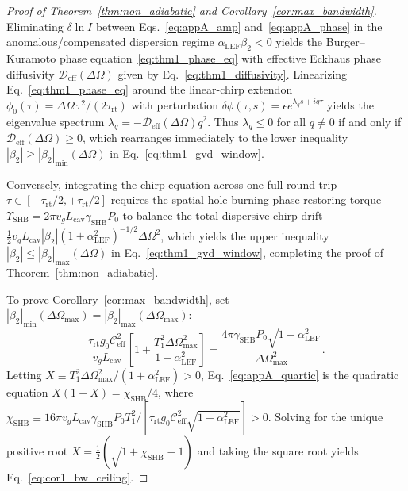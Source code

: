 \documentclass[11pt,letterpaper]{article}
\begin{document}
\begin{proof}[Proof of Theorem~\ref{thm:non_adiabatic} and Corollary~\ref{cor:max_bandwidth}]
\begin{subequations}
\end{subequations}
Eliminating $\delta\ln I$ between Eqs.~\eqref{eq:appA_amp} and~\eqref{eq:appA_phase} in the anomalous/compensated dispersion regime $\alpha_{\mathrm{LEF}}\beta_2 < 0$ yields the Burger--Kuramoto phase equation~\eqref{eq:thm1_phase_eq} with effective Eckhaus phase diffusivity $\mathcal{D}_{\mathrm{eff}}(\Delta\Omega)$ given by Eq.~\eqref{eq:thm1_diffusivity}. Linearizing Eq.~\eqref{eq:thm1_phase_eq} around the linear-chirp extendon $\phi_0(\tau) = \Delta\Omega\,\tau^2 / (2\tau_{\mathrm{rt}})$ with perturbation $\delta\phi(\tau, s) = \epsilon e^{\lambda_q s + i q \tau}$ yields the eigenvalue spectrum $\lambda_q = -\mathcal{D}_{\mathrm{eff}}(\Delta\Omega) q^2$. Thus $\lambda_q \le 0$ for all $q \neq 0$ if and only if $\mathcal{D}_{\mathrm{eff}}(\Delta\Omega) \ge 0$, which rearranges immediately to the lower inequality $|\beta_2| \ge |\beta_2|_{\min}(\Delta\Omega)$ in Eq.~\eqref{eq:thm1_gvd_window}.

Conversely, integrating the chirp equation across one full round trip $\tau \in [-\tau_{\mathrm{rt}}/2, +\tau_{\mathrm{rt}}/2]$ requires the spatial-hole-burning phase-restoring torque $\Upsilon_{\mathrm{SHB}} = 2\pi v_g L_{\mathrm{cav}}\gamma_{\mathrm{SHB}} P_0$ to balance the total dispersive chirp drift $\frac{1}{2}v_g L_{\mathrm{cav}}|\beta_2|(1 + \alpha_{\mathrm{LEF}}^2)^{-1/2}\Delta\Omega^2$, which yields the upper inequality $|\beta_2| \le |\beta_2|_{\max}(\Delta\Omega)$ in Eq.~\eqref{eq:thm1_gvd_window}, completing the proof of Theorem~\ref{thm:non_adiabatic}.

To prove Corollary~\ref{cor:max_bandwidth}, set $|\beta_2|_{\min}(\Delta\Omega_{\max}) = |\beta_2|_{\max}(\Delta\Omega_{\max})$:
\begin{equation}
\frac{\tau_{\mathrm{rt}} g_0 \mathcal{C}_{\mathrm{eff}}^2}{v_g L_{\mathrm{cav}}}\left[ 1 + \frac{T_1^2 \Delta\Omega_{\max}^2}{1 + \alpha_{\mathrm{LEF}}^2} \right] = \frac{4\pi \gamma_{\mathrm{SHB}} P_0 \sqrt{1 + \alpha_{\mathrm{LEF}}^2}}{\Delta\Omega_{\max}^2}.
\label{eq:appA_quartic}
\end{equation}
Letting $X \equiv T_1^2 \Delta\Omega_{\max}^2 / (1 + \alpha_{\mathrm{LEF}}^2) > 0$, Eq.~\eqref{eq:appA_quartic} is the quadratic equation $X(1 + X) = \chi_{\mathrm{SHB}}/4$, where $\chi_{\mathrm{SHB}} \equiv 16\pi v_g L_{\mathrm{cav}}\gamma_{\mathrm{SHB}} P_0 T_1^2 / [\tau_{\mathrm{rt}} g_0 \mathcal{C}_{\mathrm{eff}}^2 \sqrt{1 + \alpha_{\mathrm{LEF}}^2}] > 0$. Solving for the unique positive root $X = \frac{1}{2}(\sqrt{1 + \chi_{\mathrm{SHB}}} - 1)$ and taking the square root yields Eq.~\eqref{eq:cor1_bw_ceiling}.
\end{proof}
\end{document}
